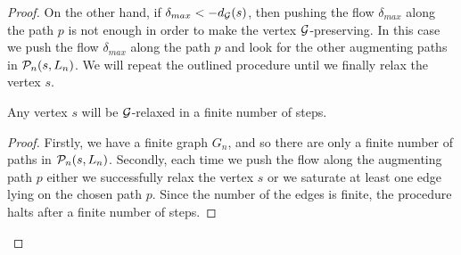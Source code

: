 \documentclass[12pt,oneside,a4paper]{amsart}
\begin{document}
\begin{proof}
        On the other hand, if $\delta_{max} < -d_{\cal{G}}(s)$, then pushing the flow $\delta_{max}$ along the path $p$ is not enough
          in order to make the vertex $\cal{G}$-preserving.
        In this case we push the flow $\delta_{max}$ along the path $p$ and look for the other augmenting paths in $\gnpaths(s, L_n)$.
        We will repeat the outlined procedure until we finally relax the vertex $s$.
        \begin{prop}
          Any vertex $s$ will be $\cal{G}$-relaxed in a finite number of steps.
        \end{prop}
        \begin{proof}
          Firstly, we have a finite graph $G_{n}$, and so there are only a finite number of paths in $\gnpaths(s, L_n)$.
          Secondly, each time we push the flow along the augmenting path $p$ either we successfully relax the vertex $s$
            or we saturate at least one edge lying on the chosen path $p$.
          Since the number of the edges is finite, the procedure halts after a finite number of steps.


\end{proof}
\end{proof}
\end{document}
